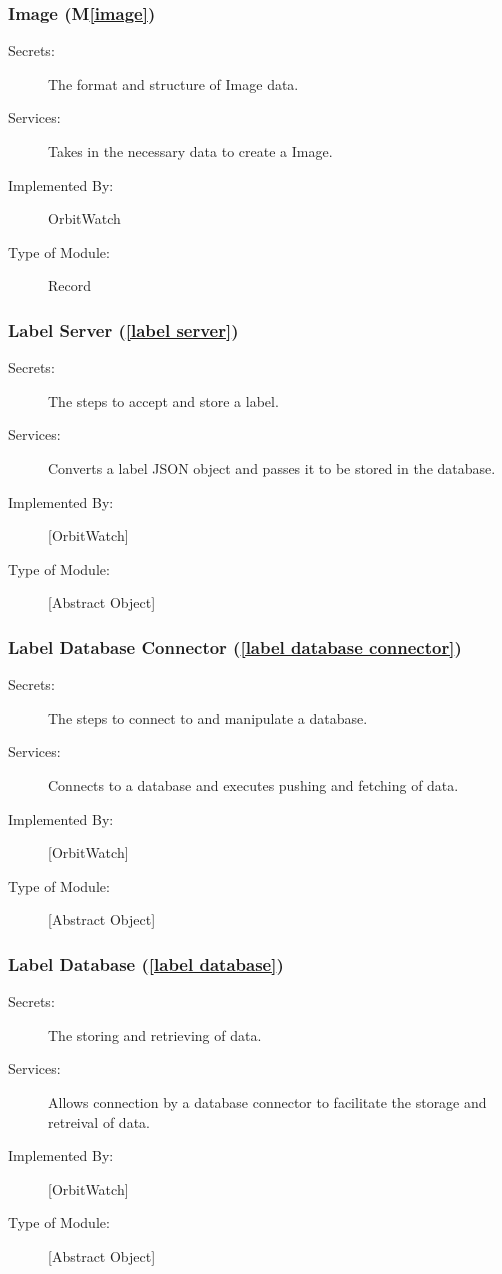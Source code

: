 \documentclass[12pt, titlepage]{article}
\newcommand{\mref}[1]{M\ref{#1}}
\begin{document}
\subsubsection{Image (\mref{image})}

\begin{description}
\item[Secrets:]The format and structure of Image data.
\item[Services:] Takes in the necessary data to create a Image.
\item[Implemented By:] OrbitWatch
\item[Type of Module:] Record
\end{description}


\subsubsection{Label Server (\ref{label server})} 
\begin{description}
  \item[Secrets:] The steps to accept and store a label.
  \item[Services:] Converts a label JSON object and passes it to be stored in the database.
  \item[Implemented By:] [OrbitWatch]
  \item[Type of Module:] [Abstract Object]
  \end{description}

\subsubsection{Label Database Connector (\ref{label database connector})}
\begin{description}
\item[Secrets:] The steps to connect to and manipulate a database.
\item[Services:] Connects to a database and executes pushing and fetching of data.
\item[Implemented By:] [OrbitWatch]
\item[Type of Module:] [Abstract Object]
\end{description}

\subsubsection{Label Database (\ref{label database})}
\begin{description}
\item[Secrets:] The storing and retrieving of data.
\item[Services:] Allows connection by a database connector to facilitate the storage and retreival of data.
\item[Implemented By:] [OrbitWatch]
\item[Type of Module:] [Abstract Object]
\end{description}
\end{document}

